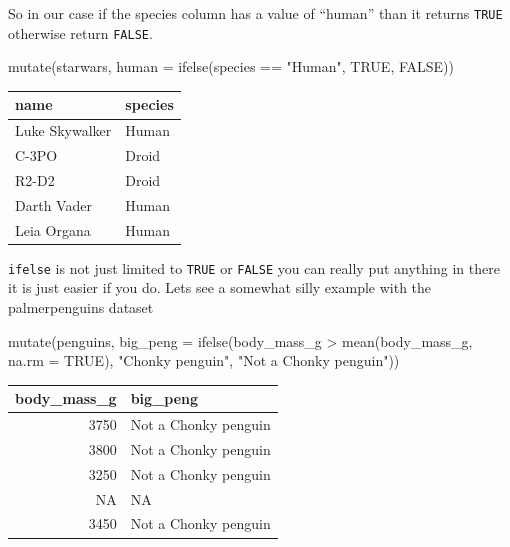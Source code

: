 \documentclass[
  letterpaper,
  DIV=11,
  numbers=noendperiod,
  oneside]{scrreprt}
\newenvironment{Shaded}{\begin{snugshade}}{\end{snugshade}}
\newcommand{\AttributeTok}[1]{\textcolor[rgb]{0.40,0.45,0.13}{#1}}
\newcommand{\ConstantTok}[1]{\textcolor[rgb]{0.56,0.35,0.01}{#1}}
\newcommand{\FunctionTok}[1]{\textcolor[rgb]{0.28,0.35,0.67}{#1}}
\newcommand{\NormalTok}[1]{\textcolor[rgb]{0.00,0.23,0.31}{#1}}
\newcommand{\SpecialCharTok}[1]{\textcolor[rgb]{0.37,0.37,0.37}{#1}}
\newcommand{\StringTok}[1]{\textcolor[rgb]{0.13,0.47,0.30}{#1}}
\begin{document}
So in our case if the species column has a value of ``human'' than it
returns \texttt{TRUE} otherwise return \texttt{FALSE}.

\begin{Shaded}
\begin{Highlighting}[]
\FunctionTok{mutate}\NormalTok{(starwars, }\AttributeTok{human =} \FunctionTok{ifelse}\NormalTok{(species }\SpecialCharTok{==} \StringTok{"Human"}\NormalTok{, }\ConstantTok{TRUE}\NormalTok{, }\ConstantTok{FALSE}\NormalTok{))}
\end{Highlighting}
\end{Shaded}

\begin{tabular}{l|l}
\hline
name & species\\
\hline
Luke Skywalker & Human\\
\hline
C-3PO & Droid\\
\hline
R2-D2 & Droid\\
\hline
Darth Vader & Human\\
\hline
Leia Organa & Human\\
\hline
\end{tabular}

\texttt{ifelse} is not just limited to \texttt{TRUE} or \texttt{FALSE}
you can really put anything in there it is just easier if you do. Lets
see a somewhat silly example with the palmerpenguins dataset

\begin{Shaded}
\begin{Highlighting}[]
\FunctionTok{mutate}\NormalTok{(penguins, }\AttributeTok{big\_peng =} \FunctionTok{ifelse}\NormalTok{(body\_mass\_g }\SpecialCharTok{\textgreater{}} \FunctionTok{mean}\NormalTok{(body\_mass\_g, }\AttributeTok{na.rm =} \ConstantTok{TRUE}\NormalTok{), }\StringTok{"Chonky penguin"}\NormalTok{, }\StringTok{"Not a Chonky penguin"}\NormalTok{))}
\end{Highlighting}
\end{Shaded}

\begin{tabular}{r|l}
\hline
body\_mass\_g & big\_peng\\
\hline
3750 & Not a Chonky penguin\\
\hline
3800 & Not a Chonky penguin\\
\hline
3250 & Not a Chonky penguin\\
\hline
NA & NA\\
\hline
3450 & Not a Chonky penguin\\
\hline
\end{tabular}
\end{document}
